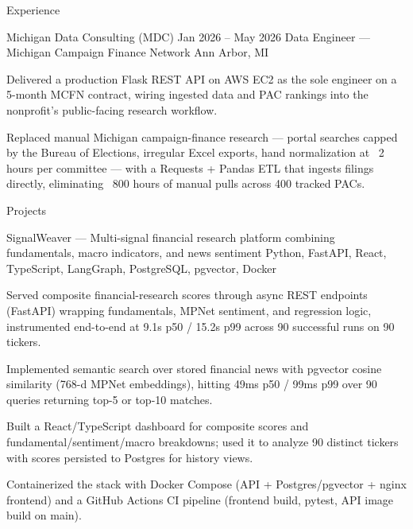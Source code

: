 \documentclass[
	11pt
]{../../../template}
\begin{document}
\begin{rSection}{E}{xperience}
		\begin{rSectionEntry}
			{Michigan Data Consulting (MDC)}
			{Jan 2026 -- May 2026}
			{Data Engineer --- Michigan Campaign Finance Network}
			{}
			{Ann Arbor, MI}

			\item Delivered a production Flask REST API on AWS EC2 as the sole engineer on a 5-month MCFN contract, wiring ingested data and PAC rankings into the nonprofit's public-facing research workflow.
			\item Replaced manual Michigan campaign-finance research --- portal searches capped by the Bureau of Elections, irregular Excel exports, hand normalization at ~2 hours per committee --- with a Requests + Pandas ETL that ingests filings directly, eliminating ~800 hours of manual pulls across 400 tracked PACs.
		\end{rSectionEntry}
	\end{rSection}

	\begin{rSection}{P}{rojects}
		\begin{rSectionEntry}
			{SignalWeaver --- Multi-signal financial research platform combining fundamentals, macro indicators, and news sentiment}
			{}
			{}
			{Python, FastAPI, React, TypeScript, LangGraph, PostgreSQL, pgvector, Docker}
			{}

			\item Served composite financial-research scores through async REST endpoints (FastAPI) wrapping fundamentals, MPNet sentiment, and regression logic, instrumented end-to-end at 9.1s p50 / 15.2s p99 across 90 successful runs on 90 tickers.
			\item Implemented semantic search over stored financial news with pgvector cosine similarity (768-d MPNet embeddings), hitting 49ms p50 / 99ms p99 over 90 queries returning top-5 or top-10 matches.
			\item Built a React/TypeScript dashboard for composite scores and fundamental/sentiment/macro breakdowns; used it to analyze 90 distinct tickers with scores persisted to Postgres for history views.
			\item Containerized the stack with Docker Compose (API + Postgres/pgvector + nginx frontend) and a GitHub Actions CI pipeline (frontend build, pytest, API image build on main).
		\end{rSectionEntry}
	\end{rSection}
\end{document}
